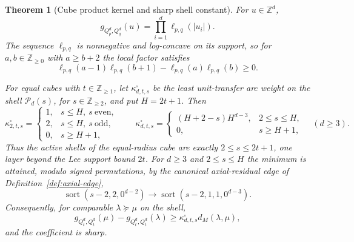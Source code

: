 \documentclass[pdflatex,sn-mathphys-num]{sn-jnl}
\theoremstyle{thmstyleone}
\newtheorem{theorem}{Theorem}[section]
\theoremstyle{thmstylethree}
\theoremstyle{thmstyletwo}
\newcommand{\Z}{\mathbb Z}
\begin{document}
\begin{theorem}[Cube product kernel and sharp shell constant]
\label{thm:cube-sharp}
For $u\in\Z^d$,
\begin{equation}
 g_{Q_p^d,Q_q^d}(u)
 =\prod_{i=1}^d\ell_{p,q}(|u_i|).                    \label{eq:cube-product}
\end{equation}
The sequence $\ell_{p,q}$ is nonnegative and log-concave on its support, so
for $a,b\in\Z_{\ge0}$ with $a\ge b+2$ the local factor satisfies
\begin{equation}
 \ell_{p,q}(a-1)\ell_{p,q}(b+1)
 -\ell_{p,q}(a)\ell_{p,q}(b)\ge0.                   \label{eq:cube-local}
\end{equation}

 For equal cubes with $t\in\Z_{\ge1}$, let
 $\kappa^\square_{d,t,s}$ be the least unit-transfer arc weight on the shell
 $\mathcal P_d(s)$, for $s\in\Z_{\ge2}$, and put $H=2t+1$.  Then
\begin{equation}
 \kappa^\square_{2,t,s}=
 \begin{cases}1,&s\le H,\ s\ \text{even},\\
              2,&s\le H,\ s\ \text{odd},\\
              0,&s\ge H+1,\end{cases}
 \qquad
 \kappa^\square_{d,t,s}=
 \begin{cases}(H+2-s)H^{d-3},&2\le s\le H,\\
              0,&s\ge H+1,\end{cases}
 \quad(d\ge3).                                      \label{eq:cube-kappa}
\end{equation}
Thus the active shells of the equal-radius cube are exactly
$2\le s\le2t+1$, one layer beyond the Lee support bound $2t$.
For $d\ge3$ and $2\le s\le H$ the minimum is attained, modulo signed
permutations, by the canonical axial-residual edge of
Definition~\ref{def:axial-edge},
\begin{equation}
 \operatorname{sort}(s-2,2,0^{d-2})
 \longrightarrow
 \operatorname{sort}(s-2,1,1,0^{d-3}).              \label{eq:cube-minimizer}
\end{equation}
Consequently, for comparable $\lambda\succeq\mu$ on the shell,
\[
 g_{Q_t^d,Q_t^d}(\mu)-g_{Q_t^d,Q_t^d}(\lambda)
 \ge\kappa^\square_{d,t,s}d_M(\lambda,\mu),
\]
and the coefficient is sharp.
\end{theorem}
\end{document}
